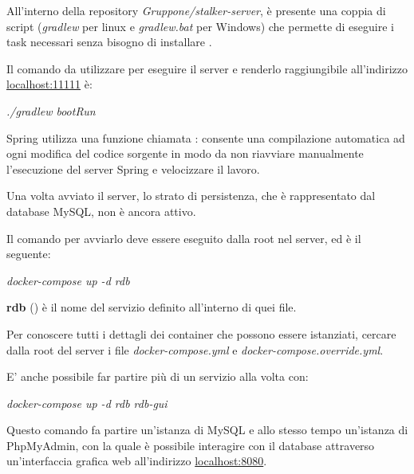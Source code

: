 \documentclass[../manuale-sviluppatore.tex]{subfiles}
\begin{document}
All'interno della repository \textit{Gruppone/stalker-server}, è presente una coppia di script (\textit{gradlew} per linux e \textit{gradlew.bat} per Windows) che permette di eseguire i task necessari senza bisogno di installare .

Il comando da utilizzare per eseguire il server e renderlo raggiungibile all'indirizzo \href{localhost:11111}{localhost:11111} è: \par\bigskip

\begin{center}
  \textit{./gradlew bootRun}
\end{center}
\par\bigskip

Spring utilizza una funzione chiamata : consente una compilazione automatica ad ogni modifica del codice sorgente in modo da non riavviare manualmente l'esecuzione del server Spring e velocizzare il lavoro.

Una volta avviato il server, lo strato di persistenza, che è rappresentato dal database MySQL, non è ancora attivo.

Il comando per avviarlo deve essere eseguito dalla root nel server, ed è il seguente: \par\bigskip

\begin{center}
  \textit{docker-compose up -d rdb}
\end{center}
\par\bigskip

\textbf{rdb} () è il nome del servizio definito all'interno di quei file.

Per conoscere tutti i dettagli dei container che possono essere istanziati, cercare dalla root del server i file \emph{docker-compose.yml} e \emph{docker-compose.override.yml}.

E' anche possibile far partire più di un servizio alla volta con: \par\bigskip

\begin{center}
  \textit{docker-compose up -d rdb rdb-gui}
\end{center}

\par\bigskip

Questo comando fa partire un'istanza di MySQL e allo stesso tempo un'istanza di PhpMyAdmin, con la quale è possibile interagire con il database attraverso un'interfaccia grafica web all'indirizzo \href{localhost:8080}{localhost:8080}.
\end{document}
